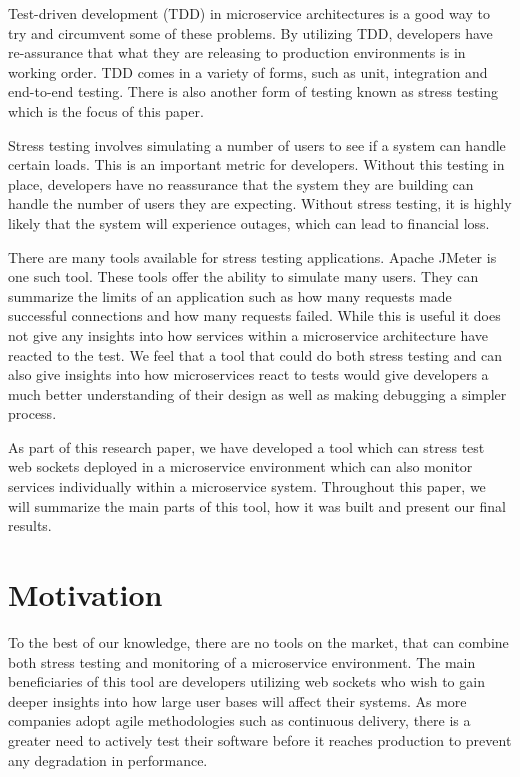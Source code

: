 Test-driven development (TDD) in microservice architectures is a good way to try and circumvent some of these problems. By utilizing TDD, developers have re-assurance that what they are releasing to production environments is in working order. TDD comes in a variety of forms, such as unit, integration and end-to-end testing. There is also another form of testing known as stress testing which is the focus of this paper. 

Stress testing involves simulating a number of users to see if a system can handle certain loads. This is an important metric for developers. Without this testing in place, developers have no reassurance that the system they are building can handle the number of users they are expecting. Without stress testing, it is highly likely that the system will experience outages, which can lead to financial loss.

There are many tools available for stress testing applications. Apache JMeter is one such tool. These tools offer the ability to simulate many users. They can summarize the limits of an application such as how many requests made successful connections and how many requests failed. While this is useful it does not give any insights into how services within a microservice architecture have reacted to the test. We feel that a tool that could do both stress testing and can also give insights into how microservices react to tests would give developers a much better understanding of their design as well as making debugging a simpler process.

As part of this research paper, we have developed a tool which can stress test web sockets deployed in a microservice environment which can also monitor services individually within a microservice system. Throughout this paper, we will summarize the main parts of this tool, how it was built and present our final results.

\section{Motivation}

To the best of our knowledge, there are no tools on the market, that can combine both stress testing and monitoring of a microservice environment. The main beneficiaries of this tool are developers utilizing web sockets who wish to gain deeper insights into how large user bases will affect their systems. As more companies adopt agile methodologies such as continuous delivery, there is a greater need to actively test their software before it reaches production to prevent any degradation in performance.


